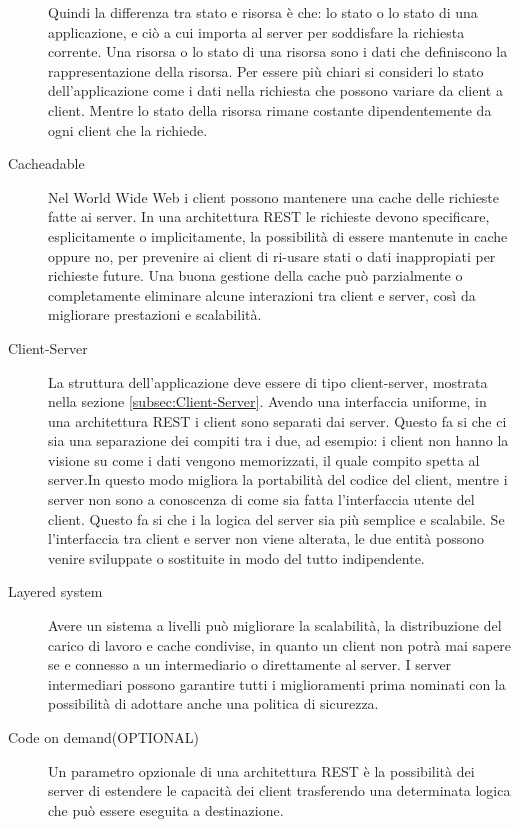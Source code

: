 \begin{description}
Quindi la differenza tra stato e risorsa è che: lo stato o lo stato di una applicazione, e ciò a cui importa al server per soddisfare la richiesta corrente. Una risorsa o lo stato di una risorsa sono i dati che definiscono la rappresentazione della risorsa.
Per essere più chiari si consideri lo stato dell'applicazione come i dati nella richiesta che possono variare da client a client. Mentre lo stato della risorsa rimane costante dipendentemente da ogni client che la richiede.

\item[Cacheadable]

Nel World Wide Web i client possono mantenere una cache delle richieste fatte ai server. In una architettura REST le richieste devono specificare, esplicitamente o implicitamente, la possibilità di essere mantenute in cache oppure no, per prevenire ai client di ri-usare stati o dati inappropiati per richieste future. Una buona gestione della cache può parzialmente o completamente eliminare alcune interazioni tra client e server, così da migliorare prestazioni e scalabilità.

\item[Client-Server]  

La struttura dell'applicazione deve essere di tipo client-server, mostrata nella sezione \ref{subsec:Client-Server}. Avendo una interfaccia uniforme, in una architettura REST i client sono separati dai server. Questo fa si che ci sia una separazione dei compiti tra i due, ad esempio: i client non hanno la visione su come i dati vengono memorizzati, il quale compito spetta al server.In questo modo migliora la portabilità del codice del client, mentre i server non sono a conoscenza di come sia fatta l'interfaccia utente del client. Questo fa si che i la logica del server sia più semplice e scalabile. Se l'interfaccia tra client e server non viene alterata, le due entità possono venire sviluppate o sostituite in modo del tutto indipendente.  

\item[Layered system]

Avere un sistema a livelli può migliorare la scalabilità, la distribuzione del carico di lavoro e cache condivise, in quanto un client non potrà mai sapere se e connesso a un intermediario o direttamente al server. I server intermediari possono garantire tutti i miglioramenti prima nominati con la possibilità di adottare anche una politica di sicurezza.

\item[Code on demand(OPTIONAL)]

Un parametro opzionale di una architettura REST è la possibilità dei server di estendere le capacità dei client trasferendo una determinata logica che può essere eseguita a destinazione.

\end{description}

